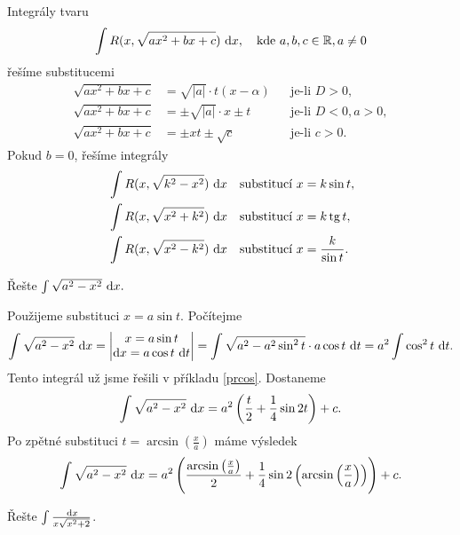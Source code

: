 \begin{veta}
    Integrály tvaru
    $$\int R(x,\sqrt{ax^2+bx+c}) \, \mathop{}\!\mathrm{d} x, \quad \textrm{kde } a,b,c\in \mathbb R, a \ne 0$$
    řešíme substitucemi
    \begin{align*}
    \sqrt{ax^2+bx+c} &= \sqrt{|a|}\cdot t(x-\alpha) & & \textrm{je-li }D >0,  \\
    \sqrt{ax^2+bx+c} &= \pm\sqrt{|a|}\cdot x\pm t & & \textrm{je-li }D <0, a>0, \\
    \sqrt{ax^2+bx+c} &= \pm xt \pm \sqrt{c}  & & \textrm{je-li }c >0.
    \end{align*}
    Pokud $b=0$, řešíme integrály
    \begin{align*}
        &\int R(x, \sqrt{k^2-x^2} )\, \mathop{}\!\mathrm{d} x & & \textrm{substitucí } x=k\sin t, \\
        &\int R(x, \sqrt{x^2+k^2})\, \mathop{}\!\mathrm{d} x & & \textrm{substitucí } x=k\operatorname{tg} t, \\
        &\int R(x, \sqrt{x^2-k^2} )\, \mathop{}\!\mathrm{d} x & & \textrm{substitucí } x=\frac{k}{\sin t}.
    \end{align*}
\end{veta}

\begin{priklad}\label{probsah}
Řešte $\int \sqrt{a^2-x^2}\, \mathop{}\!\mathrm{d} x. $
\end{priklad}

\begin{reseni}
	Použijeme substituci $x=a\sin t$. Počítejme
	$$
	    \int \sqrt{a^2-x^2}\, \mathop{}\!\mathrm{d} x = \begin{vmatrix}
						x=a\sin t\\
						\mathop{}\!\mathrm{d} x = a \cos t \, \mathop{}\!\mathrm{d} t
					\end{vmatrix} = \int \sqrt{a^2 - a^2 \sin^2 t} \cdot a \cos t \, \mathop{}\!\mathrm{d} t = a^2 \int \cos^2 t \, \mathop{}\!\mathrm{d} t.
	$$
	Tento integrál už jsme řešili v příkladu \ref{prcos}. Dostaneme
	$$
	    \int \sqrt{a^2-x^2}\, \mathop{}\!\mathrm{d} x = a^2 \left( \frac{t }{2} + \frac{1}{4} \sin 2t \right )   + c.
	$$
	Po zpětné substituci $t=\arcsin \left( \frac{x}{a} \right ) $ máme výsledek
	$$
	    \int \sqrt{a^2-x^2}\, \mathop{}\!\mathrm{d} x = a^2 \left( \frac{\arcsin \left( \frac{x}{a} \right ) }{2} + \frac{1}{4} \sin 2 \left( \arcsin \left( \frac{x}{a} \right ) \right )  \right )   + c.
	$$
\end{reseni}

\begin{priklad}
Řešte $\int \frac{\, \mathop{}\!\mathrm{d} x}{x \sqrt{x^2+2} }$.
\end{priklad}

